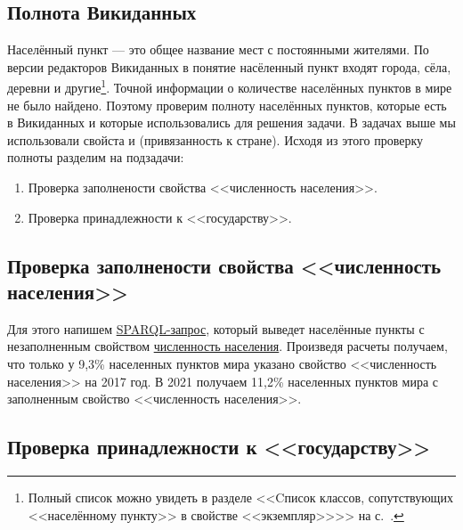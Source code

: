 \subsection{Полнота Викиданных}

Населённый пункт — это общее название мест с постоянными жителями\autocite{Humansettlements_Dictionary}. По версии редакторов Викиданных в понятие насёленный пункт входят города, сёла, деревни и другие\footnote{Полный список можно увидеть в разделе <<Cписок классов, сопутствующих <<населённому пункту>> в свойстве <<экземпляр>>>> на с.~\pageref{human-settlement:tag1}.}.
Точной информации о количестве населённых пунктов в мире не было найдено. Поэтому проверим полноту населённых пунктов, которые есть в Викиданных и которые использовались для решения задачи. В задачах выше мы использовали свойста  и  (привязанность к стране). Исходя из этого проверку полноты разделим на подзадачи: 
\begin{enumerate} 
  \item Проверка заполнености свойства <<численность населения>>.
  \item Проверка принадлежности к <<государству>>.
\end{enumerate}

\subsection{Проверка заполнености свойства <<численность населения>> }

Для этого напишем \href{https://w.wiki/4FUz}{SPARQL-запрос}\footnotemark, который выведет населённые пункты с незаполненным свойством \href{http://www.wikidata.org/entity/P1082}{численность населения}. 
Произведя расчеты получаем, что только у 9,3\% населенных пунктов мира указано свойство <<численность населения>> на 2017 год. В 2021 получаем 11,2\% населенных пунктов мира с заполненным свойство <<численность населения>>.

\subsection{Проверка принадлежности к <<государству>>}

